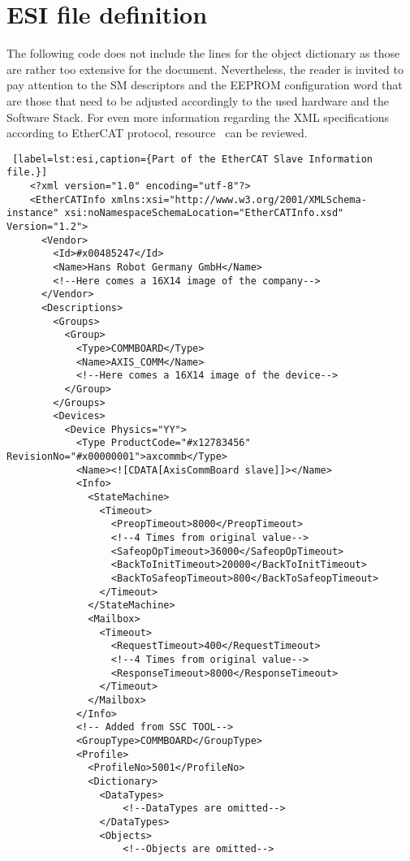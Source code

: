 \chapter{ESI file definition}\label{app:esi_file}
The following code does not include the lines for the object dictionary as those are rather too extensive for the document. 
Nevertheless, the reader is invited to pay attention to the SM descriptors and the EEPROM configuration word that are those that
need to be adjusted accordingly to the used hardware and the Software Stack.
For even more information regarding the XML specifications according to EtherCAT protocol, resource~\cite{beckhoff_esi} can be 
reviewed.
\begin{lstlisting} [label=lst:esi,caption={Part of the EtherCAT Slave Information file.}]
    <?xml version="1.0" encoding="utf-8"?>
    <EtherCATInfo xmlns:xsi="http://www.w3.org/2001/XMLSchema-instance" xsi:noNamespaceSchemaLocation="EtherCATInfo.xsd" Version="1.2">
      <Vendor>
        <Id>#x00485247</Id>
        <Name>Hans Robot Germany GmbH</Name>
        <!--Here comes a 16X14 image of the company-->
      </Vendor>
      <Descriptions>
        <Groups>
          <Group>
            <Type>COMMBOARD</Type>
            <Name>AXIS_COMM</Name>
            <!--Here comes a 16X14 image of the device-->
          </Group>
        </Groups>
        <Devices>
          <Device Physics="YY">
            <Type ProductCode="#x12783456" RevisionNo="#x00000001">axcommb</Type>
            <Name><![CDATA[AxisCommBoard slave]]></Name>
            <Info>
              <StateMachine>
                <Timeout>
                  <PreopTimeout>8000</PreopTimeout>
                  <!--4 Times from original value-->
                  <SafeopOpTimeout>36000</SafeopOpTimeout>
                  <BackToInitTimeout>20000</BackToInitTimeout>
                  <BackToSafeopTimeout>800</BackToSafeopTimeout>
                </Timeout>
              </StateMachine>
              <Mailbox>
                <Timeout>
                  <RequestTimeout>400</RequestTimeout>
                  <!--4 Times from original value-->
                  <ResponseTimeout>8000</ResponseTimeout>
                </Timeout>
              </Mailbox>
            </Info>
            <!-- Added from SSC TOOL-->
            <GroupType>COMMBOARD</GroupType>
            <Profile>
              <ProfileNo>5001</ProfileNo>
              <Dictionary>
                <DataTypes>
                    <!--DataTypes are omitted-->
                </DataTypes>
                <Objects>
                    <!--Objects are omitted-->

\end{lstlisting}
